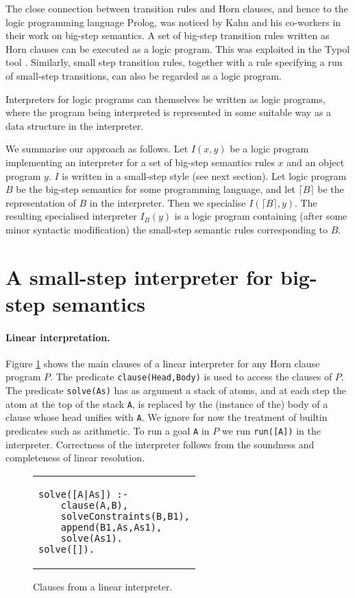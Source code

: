 \documentclass{llncs}
\begin{document}
The close connection between transition rules and Horn clauses, and hence to the logic programming language Prolog, 
was noticed by Kahn and his co-workers in their work on big-step semantics.
A set of big-step transition rules written as Horn clauses can be executed as a logic program. This was exploited in
the Typol tool \cite{Typol}. Similarly, small step transition rules, together with a rule specifying a run of
small-step transitions, can also be regarded as a logic program.

Interpreters for logic programs can themselves be written as logic programs, where the program being interpreted 
is represented in some suitable way as a data structure in the interpreter.  

We summarise our approach as follows.  Let $I(x,y)$ be a logic program implementing an interpreter for a set of
big-step semantics rules $x$ and an object program $y$. $I$ is written in a small-step style (see next section).  Let logic program $B$ be the big-step semantics
for some programming language, and let $\lceil B \rceil$ be the representation of $B$ in the interpreter.  Then we specialise 
$I(\lceil B \rceil,y)$.  The resulting specialised interpreter $I_B(y)$ is a logic program containing (after some minor syntactic modification) 
the small-step semantic rules
corresponding to $B$.

\section{A small-step interpreter for big-step semantics}

\paragraph{Linear interpretation.}  Figure \ref{fig:linear-interp} shows the main clauses of a linear interpreter for any Horn clause program $P$.  
The predicate \texttt{clause(Head,Body)} is used to access the clauses of $P$.  The predicate \texttt{solve(As)} has as argument a stack of atoms, and
at each step the atom at the top of the stack \texttt{A}, is replaced by the (instance of the) body of a clause whose head unifies with \texttt{A}.
We ignore for now the treatment of builtin predicates such as arithmetic.
To run a goal \texttt{A} in $P$ we run \texttt{run([A])} in the interpreter.  
Correctness of the interpreter follows from the soundness and completeness of linear resolution.
\begin{figure}
\begin{tabular}{l}
\begin{lstlisting}
solve([A|As]) :- 
	clause(A,B),
	solveConstraints(B,B1),
	append(B1,As,As1),
	solve(As1).
solve([]).
\end{lstlisting}
\end{tabular}
\caption{Clauses from a linear interpreter.}\label{fig:linear-interp}
\end{figure}
\end{document}
